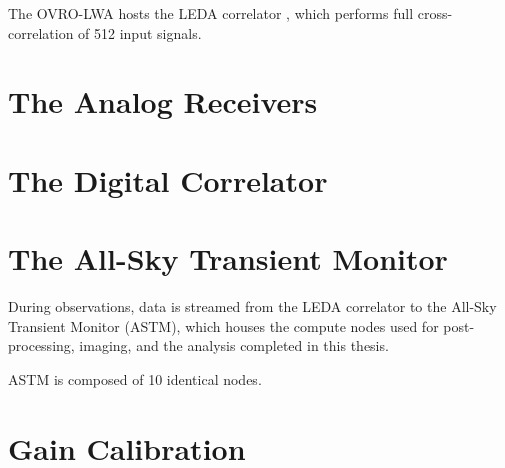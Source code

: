 \begin{bibunit}
The OVRO-LWA hosts the LEDA correlator \citep{2015JAI.....450003K}, which performs full
cross-correlation of 512 input signals.


\section{The Analog Receivers}







\section{The Digital Correlator}



\section{The All-Sky Transient Monitor}

During observations, data is streamed from the LEDA correlator to the All-Sky Transient Monitor
(ASTM), which houses the compute nodes used for post-processing, imaging, and the analysis completed
in this thesis.

ASTM is composed of 10 identical nodes.





\section{Gain Calibration}


\end{bibunit}
